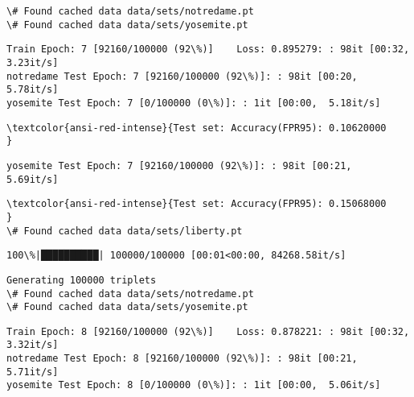\documentclass[11pt]{article}
\begin{document}
    \begin{Verbatim}[commandchars=\\\{\}]
\# Found cached data data/sets/notredame.pt
\# Found cached data data/sets/yosemite.pt

    \end{Verbatim}

    \begin{Verbatim}[commandchars=\\\{\}]
Train Epoch: 7 [92160/100000 (92\%)]	Loss: 0.895279: : 98it [00:32,  3.23it/s]
notredame Test Epoch: 7 [92160/100000 (92\%)]: : 98it [00:20,  5.78it/s]
yosemite Test Epoch: 7 [0/100000 (0\%)]: : 1it [00:00,  5.18it/s]
    \end{Verbatim}

    \begin{Verbatim}[commandchars=\\\{\}]
\textcolor{ansi-red-intense}{Test set: Accuracy(FPR95): 0.10620000
}

    \end{Verbatim}

    \begin{Verbatim}[commandchars=\\\{\}]
yosemite Test Epoch: 7 [92160/100000 (92\%)]: : 98it [00:21,  5.69it/s]

    \end{Verbatim}

    \begin{Verbatim}[commandchars=\\\{\}]
\textcolor{ansi-red-intense}{Test set: Accuracy(FPR95): 0.15068000
}
\# Found cached data data/sets/liberty.pt

    \end{Verbatim}

    \begin{Verbatim}[commandchars=\\\{\}]
100\%|██████████| 100000/100000 [00:01<00:00, 84268.58it/s]

    \end{Verbatim}

    \begin{Verbatim}[commandchars=\\\{\}]
Generating 100000 triplets
\# Found cached data data/sets/notredame.pt
\# Found cached data data/sets/yosemite.pt

    \end{Verbatim}

    \begin{Verbatim}[commandchars=\\\{\}]
Train Epoch: 8 [92160/100000 (92\%)]	Loss: 0.878221: : 98it [00:32,  3.32it/s]
notredame Test Epoch: 8 [92160/100000 (92\%)]: : 98it [00:21,  5.71it/s]
yosemite Test Epoch: 8 [0/100000 (0\%)]: : 1it [00:00,  5.06it/s]
    \end{Verbatim}
\end{document}
